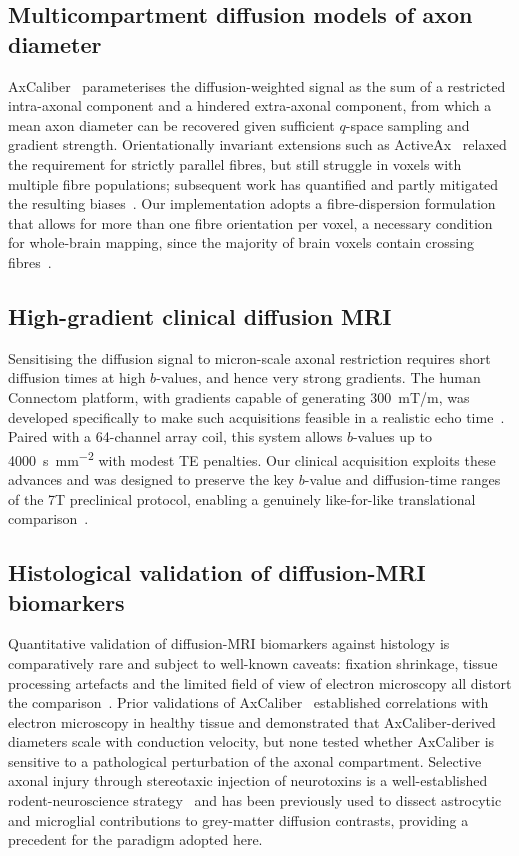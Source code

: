 \documentclass[11pt]{article}
\begin{document}
\subsection*{Multicompartment diffusion models of axon diameter}
AxCaliber~\cite{assaf2008axcaliber} parameterises the diffusion-weighted signal as the sum of a restricted intra-axonal component and a hindered extra-axonal component, from which a mean axon diameter can be recovered given sufficient $q$-space sampling and gradient strength. Orientationally invariant extensions such as ActiveAx~\cite{alexander2010orientationally} relaxed the requirement for strictly parallel fibres, but still struggle in voxels with multiple fibre populations; subsequent work has quantified and partly mitigated the resulting biases~\cite{sepehrband2016towards,desantis2019whole}. Our implementation adopts a fibre-dispersion formulation~\cite{desantis2019whole,tax2014recursive} that allows for more than one fibre orientation per voxel, a necessary condition for whole-brain mapping, since the majority of brain voxels contain crossing fibres~\cite{jeurissen2013investigating}.

\subsection*{High-gradient clinical diffusion MRI}
Sensitising the diffusion signal to micron-scale axonal restriction requires short diffusion times at high $b$-values, and hence very strong gradients. The human Connectom platform, with gradients capable of generating \SI{300}{mT/m}, was developed specifically to make such acquisitions feasible in a realistic echo time~\cite{jones2018microstructural}. Paired with a 64-channel array coil, this system allows $b$-values up to \SI{4000}{\second\per\square\milli\meter} with modest TE penalties. Our clinical acquisition exploits these advances and was designed to preserve the key $b$-value and diffusion-time ranges of the 7T preclinical protocol, enabling a genuinely like-for-like translational comparison~\cite{desantis2019whole}.

\subsection*{Histological validation of diffusion-MRI biomarkers}
Quantitative validation of diffusion-MRI biomarkers against histology is comparatively rare and subject to well-known caveats: fixation shrinkage, tissue processing artefacts and the limited field of view of electron microscopy all distort the comparison~\cite{horowitz2015axon}. Prior validations of AxCaliber~\cite{barazany2009invivo,horowitz2015axon} established correlations with electron microscopy in healthy tissue and demonstrated that AxCaliber-derived diameters scale with conduction velocity, but none tested whether AxCaliber is sensitive to a pathological perturbation of the axonal compartment. Selective axonal injury through stereotaxic injection of neurotoxins is a well-established rodent-neuroscience strategy~\cite{conforti2014wallerian,adalbert2012intra} and has been previously used to dissect astrocytic and microglial contributions to grey-matter diffusion contrasts, providing a precedent for the paradigm adopted here.
\end{document}
